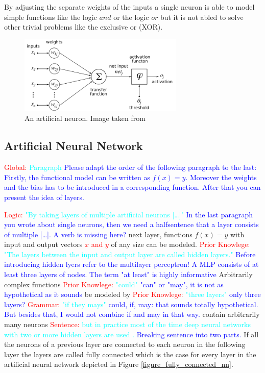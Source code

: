 By adjusting the separate weights of the inputs a single neuron is able to model
simple functions like the logic $and$ or the logic $or$ but it is not abled to solve other trivial problems
like the exclusive or (XOR).

\begin{figure}[h]
    \centering
    \includegraphics[width=0.7\textwidth]{images/figures/artificial_neuronHOML.png}
    \caption{An artificial neuron. Image taken from \parencite{2005-chrislb-artificial-neuron}}
\end{figure}


\subsection{Artificial Neural Network}\label{ssec:artnn}

\textcolor{red}{Global:} \textcolor{cyan}{Paragraph} \textcolor{blue}{Please adapt the order of the following paragraph to the last: Firstly, the functional model can be written as $f(x) = y$. Moreover the weights and the bias has to be introduced in a corresponding function. After that you can present the idea of layers.}

\textcolor{red}{Logic:} \textcolor{cyan}{"By taking layers of multiple artificial neurons [\dots]"} \textcolor{blue}{In the last paragraph you wrote about single neurons, then we need a halfsentence that a layer consists of multiple [\dots]. A verb is missing here?}
next layer, functions $f(x) = y$ with input and output vectors \textcolor{red}{$x$ and $y$} of any size can be modeled.
\textcolor{red}{Prior Knowlege:} \textcolor{cyan}{"The layers between the input and output layer are called hidden layers."}  \textcolor{blue}{Before introducing hidden lyers refer to the multilayer perceptron! A MLP consists of at least three layers of nodes. The term "at least" is highly informative} 
Arbitrarily complex functions
\textcolor{red}{Prior Knowlege:} \textcolor{cyan}{"could"} \textcolor{blue}{"can" or "may", it is not as hypothetical as it sounds} 
be modeled by 
\textcolor{red}{Prior Knowlege:} \textcolor{cyan}{"three layers"} \textcolor{blue}{only three layers?} 
\textcolor{red}{Grammar:} \textcolor{cyan}{"if they mays"} \textcolor{blue}{could, if, may: that sounds totally hypothetical. But besides that, I would not combine if and may in that way.} 
contain arbitrarily many neurons 
\textcolor{red}{Sentence:} \textcolor{cyan}{but in practice most of the time
deep neural networks with two or more hidden layers are used \parencite{2017-geron-homl}.} \textcolor{blue}{Breaking sentence into two parts.} 
If all the neurons of a previous layer are connected to each neuron in the following layer the layers are
called fully connected which is the case for every layer in the artificial neural network depicted
in Figure \ref{figure_fully_connected_nn}.

